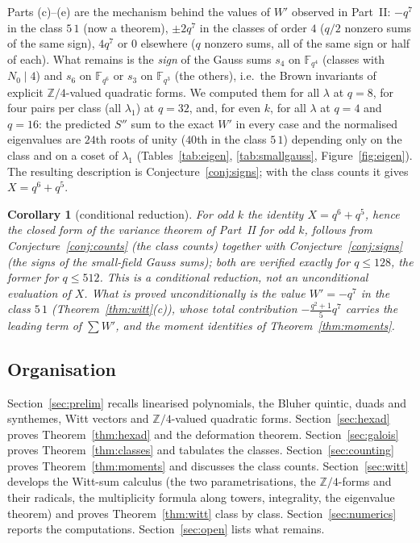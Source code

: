 ﻿\documentclass[12pt,a4paper]{amsart}
\newtheorem{corollary}[theorem]{Corollary}
\theoremstyle{definition}
\newcommand{\F}{\mathbb{F}}
\newcommand{\Z}{\mathbb{Z}}
\newcommand{\Spp}{S''}
\begin{document}
Parts (c)--(e) are the mechanism behind the values of $W'$ observed in Part~II: $-q^7$ in the class $5\,1$ (now a theorem), $\pm2q^7$ in the classes of order $4$ ($q/2$ nonzero sums of the same sign), $4q^7$ or $0$ elsewhere ($q$ nonzero sums, all of the same sign or half of each). What remains is the \emph{sign} of the Gauss sums $s_4$ on $\F_{q^4}$ (classes with $N_0\mid4$) and $s_6$ on $\F_{q^6}$ or $s_3$ on $\F_{q^3}$ (the others), i.e.\ the Brown invariants of explicit $\Z/4$-valued quadratic forms. We computed them for all $\lambda$ at $q=8$, for four pairs per class (all $\lambda_1$) at $q=32$, and, for even $k$, for all $\lambda$ at $q=4$ and $q=16$: the predicted $\Spp$ sum to the exact $W'$ in every case and the normalised eigenvalues are $24$th roots of unity ($40$th in the class $5\,1$) depending only on the class and on a coset of $\lambda_1$ (Tables~\ref{tab:eigen}, \ref{tab:smallgauss}, Figure~\ref{fig:eigen}). The resulting description is Conjecture~\ref{conj:signs}; with the class counts it gives $X=q^6+q^5$.

\begin{corollary}[conditional reduction]\label{cor:X}
For odd $k$ the identity $X=q^6+q^5$, hence the closed form of the variance theorem of Part~II for odd $k$, follows from Conjecture~\ref{conj:counts} (the class counts) together with Conjecture~\ref{conj:signs} (the signs of the small-field Gauss sums); both are verified exactly for $q\le128$, the former for $q\le512$. This is a conditional reduction, not an unconditional evaluation of $X$. What is proved unconditionally is the value $W'=-q^7$ in the class $5\,1$ (Theorem~\ref{thm:witt}(c)), whose total contribution $-\frac{q^2+1}{5}q^7$ carries the leading term of $\sum W'$, and the moment identities of Theorem~\ref{thm:moments}.
\end{corollary}

\subsection{Organisation}
Section~\ref{sec:prelim} recalls linearised polynomials, the Bluher quintic, duads and synthemes, Witt vectors and $\Z/4$-valued quadratic forms. Section~\ref{sec:hexad} proves Theorem~\ref{thm:hexad} and the deformation theorem. Section~\ref{sec:galois} proves Theorem~\ref{thm:classes} and tabulates the classes. Section~\ref{sec:counting} proves Theorem~\ref{thm:moments} and discusses the class counts. Section~\ref{sec:witt} develops the Witt-sum calculus (the two parametrisations, the $\Z/4$-forms and their radicals, the multiplicity formula along towers, integrality, the eigenvalue theorem) and proves Theorem~\ref{thm:witt} class by class. Section~\ref{sec:numerics} reports the computations. Section~\ref{sec:open} lists what remains.
\end{document}
